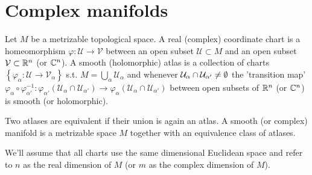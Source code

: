 \section{Complex manifolds}
\begin{definition}
  Let $M$ be a metrizable topological space. A real (complex) coordinate chart is a homeomorphism $\varphi:\mathcal{U}\to \mathcal{V}$ between an open subset $\mathcal{U}\subset M$ and an open subset $\mathcal{V}\subset \mathbb{R}^{n}$ (or $\mathbb{C}^{n}$). A smooth (holomorphic) atlas is a collection of charts $\left\{\varphi_\alpha:\mathcal{U}\to \mathcal{V}_\alpha\right\} $ s.t. $M=\bigcup_{\alpha} \mathcal{U}_\alpha$ and whenever $\mathcal{U}_\alpha \cap \mathcal{U}_{\alpha'}\neq \emptyset$ the 'transition map' $\varphi_\alpha\circ \varphi_{\alpha'}^{-1}:\varphi_{\alpha'}\left( \mathcal{U}_\alpha \cap \mathcal{U}_{\alpha'} \right) \to \varphi_\alpha \left( \mathcal{U}_\alpha \cap \mathcal{U}_{\alpha'} \right) $ between open subsets of $\mathbb{R}^{n}$ (or $\mathbb{C}^{n}$) is smooth (or holomorphic). 
\end{definition}
Two atlases are equivalent if their union is again an atlas. A smooth (or complex) manifold is a metrizable space $M$ together with an equivalence class of atlases.  

We'll assume that all charts use the same dimensional Euclidean space and refer to $n$ as the real dimension of $M$ (or $m$ as the complex dimension of $M$).

